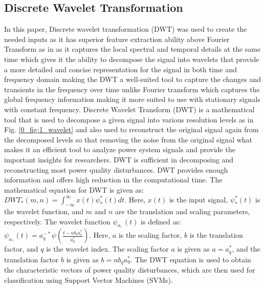 \documentclass[8pt,a4paper,oneside]{elsarticle}
\begin{document}
\subsection{Discrete Wavelet Transformation}
In this paper, Discrete wavelet transformation (DWT) was used to create the needed inputs as it has superior feature extraction ability above Fourier Transform as in \cite{10.1109/99.388960_intro_to_wt_iaddedallthetxt_24} as it captures the local spectral and temporal details at the same time which gives it the ability to decompose the signal into wavelets that provide a more detailed and concise representation for the signal in both time and frequency domain making the DWT a well-suited tool to capture the changes and transients in the frequency over time unlike Fourier transform which captures the global frequency information making it more suited to use with stationary signals with constant frequency\cite{10.48550/arxiv.2101.06707_25}.
 Discrete Wavelet Transform (DWT) is a mathematical tool that is used to decompose a given signal into various resolution levels as in Fig. \ref{0_fig:1_wavelet} and  also used to reconstruct the original signal again from the decomposed levels so that removing the noise from the original signal what makes it an efficient tool to analyze power system signals and provide the important insights for researchers\cite{10.14569/ijacsa.2019.0100348_26}.
 DWT is sufficient in decomposing and reconstructing most power quality disturbances.
DWT provides enough information and offers high reduction in the computational time.
 The mathematical equation for DWT is given as:\newline\vspace{5px}
   $DWT_{*}(m, n)=\int_{-\infty}^{\infty} x(t) \psi_{*}^{*}(t) dt$.\newline
   Here, $x(t)$ is the input signal, $\psi_{*}^{*}(t)$ is the wavelet function, and $m$ and $n$ are the translation and scaling parameters, respectively.\newline
 The wavelet function $\psi_{\alpha,}(t)$ is defined as:\newline
       $\psi_{\alpha,}(t)=a_{q}^{-*} \psi\left(\frac{t-n b_{i} a_{i}^{*}}{a_{q}^{*}}\right)$.\newline
  Here, $a$ is the scaling factor, $b$ is the translation factor, and $q$ is the wavelet index.
 The scaling factor $a$ is given as $a=a_{q}^{*}$, and the translation factor $b$ is given as $b=n b_{q} a_{9}^{*}$.
The DWT equation is used to obtain the characteristic vectors of power quality disturbances, which are then used for classification using Support Vector Machines (SVMs).
\end{document}
